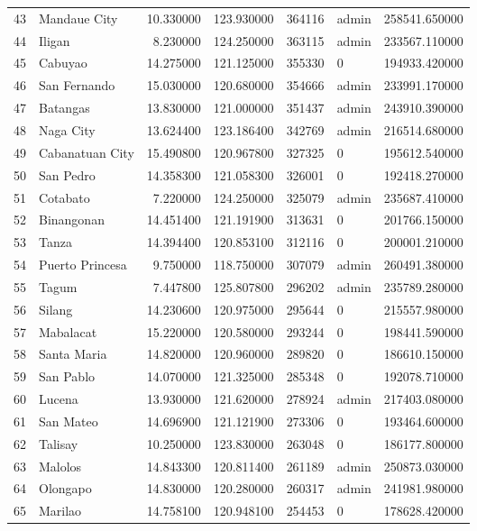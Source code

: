 \begin{longtable}{rlrrrlr}
43 & Mandaue City & 10.330000 & 123.930000 & 364116 & admin & 258541.650000 \\
44 & Iligan & 8.230000 & 124.250000 & 363115 & admin & 233567.110000 \\
45 & Cabuyao & 14.275000 & 121.125000 & 355330 & 0 & 194933.420000 \\
46 & San Fernando & 15.030000 & 120.680000 & 354666 & admin & 233991.170000 \\
47 & Batangas & 13.830000 & 121.000000 & 351437 & admin & 243910.390000 \\
48 & Naga City & 13.624400 & 123.186400 & 342769 & admin & 216514.680000 \\
49 & Cabanatuan City & 15.490800 & 120.967800 & 327325 & 0 & 195612.540000 \\
50 & San Pedro & 14.358300 & 121.058300 & 326001 & 0 & 192418.270000 \\
51 & Cotabato & 7.220000 & 124.250000 & 325079 & admin & 235687.410000 \\
52 & Binangonan & 14.451400 & 121.191900 & 313631 & 0 & 201766.150000 \\
53 & Tanza & 14.394400 & 120.853100 & 312116 & 0 & 200001.210000 \\
54 & Puerto Princesa & 9.750000 & 118.750000 & 307079 & admin & 260491.380000 \\
55 & Tagum & 7.447800 & 125.807800 & 296202 & admin & 235789.280000 \\
56 & Silang & 14.230600 & 120.975000 & 295644 & 0 & 215557.980000 \\
57 & Mabalacat & 15.220000 & 120.580000 & 293244 & 0 & 198441.590000 \\
58 & Santa Maria & 14.820000 & 120.960000 & 289820 & 0 & 186610.150000 \\
59 & San Pablo & 14.070000 & 121.325000 & 285348 & 0 & 192078.710000 \\
60 & Lucena & 13.930000 & 121.620000 & 278924 & admin & 217403.080000 \\
61 & San Mateo & 14.696900 & 121.121900 & 273306 & 0 & 193464.600000 \\
62 & Talisay & 10.250000 & 123.830000 & 263048 & 0 & 186177.800000 \\
63 & Malolos & 14.843300 & 120.811400 & 261189 & admin & 250873.030000 \\
64 & Olongapo & 14.830000 & 120.280000 & 260317 & admin & 241981.980000 \\
65 & Marilao & 14.758100 & 120.948100 & 254453 & 0 & 178628.420000 \\

\end{longtable}
